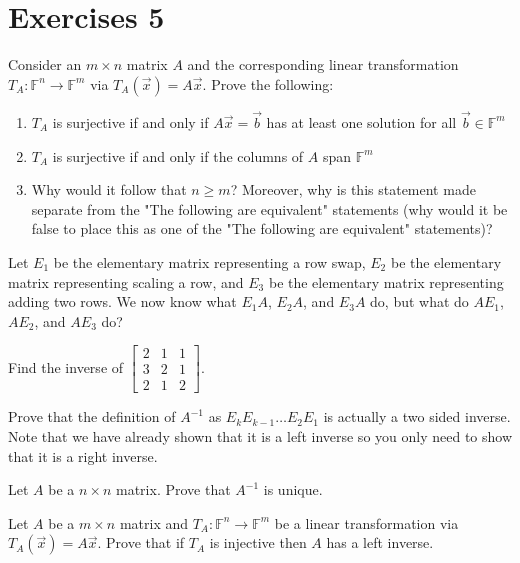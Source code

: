 \section{Exercises 5}
\begin{exercise}
    Consider an $m\times n$ matrix $A$ and the corresponding linear transformation $T_A:\mathbb{F}^n\to\mathbb{F}^m$ via $T_A(\vec{x})=A\vec{x}$. Prove the following:
    \begin{enumerate}[label=(\alph*)]
        \item $T_A$ is surjective if and only if $A\vec{x}=\vec{b}$ has at least one solution for all $\vec{b}\in\mathbb{F}^m$
        \item $T_A$ is surjective if and only if the columns of $A$ span $\mathbb{F}^m$
        \item Why would it follow that $n\geq m$? Moreover, why is this statement made separate from the "The following are equivalent" statements (why would it be false to place this as one of the "The following are equivalent" statements)?
    \end{enumerate}
\end{exercise}
\begin{exercise}
    Let $E_1$ be the elementary matrix representing a row swap, $E_2$ be the elementary matrix representing scaling a row, and $E_3$ be the elementary matrix representing adding two rows. We now know what $E_1A$, $E_2A$, and $E_3A$ do, but what do $AE_1$, $AE_2$, and $AE_3$ do?
\end{exercise}
\begin{exercise}
    Find the inverse of $\begin{bmatrix}
        2 & 1 & 1 \\
        3 & 2 & 1 \\
        2 & 1 & 2
    \end{bmatrix}$.
\end{exercise}
\begin{exercise}
    Prove that the definition of $A^{-1}$ as $E_kE_{k-1}\ldots E_2E_1$ is actually a two sided inverse. Note that we have already shown that it is a left inverse so you only need to show that it is a right inverse.
\end{exercise}
\begin{exercise}
    Let $A$ be a $n\times n$ matrix. Prove that $A^{-1}$ is unique.
\end{exercise}
\begin{exercise}
    Let $A$ be a $m\times n$ matrix and $T_A:\mathbb{F}^n\to \mathbb{F}^m$ be a linear transformation via $T_A(\vec{x})=A\vec{x}$. Prove that if $T_A$ is injective then $A$ has a left inverse.
\end{exercise}
